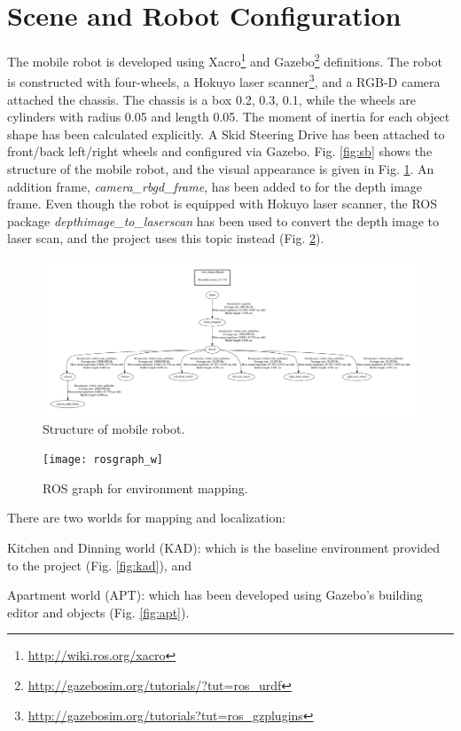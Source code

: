 \documentclass[10pt,journal,compsoc]{IEEEtran}
\begin{document}
\section{Scene and Robot Configuration}

The mobile robot is developed using Xacro\footnote{\url{http://wiki.ros.org/xacro}} and Gazebo\footnote{\url{http://gazebosim.org/tutorials/?tut=ros_urdf}} definitions. The robot is constructed  with four-wheels, a Hokuyo laser scanner\footnote{\url{http://gazebosim.org/tutorials?tut=ros_gzplugins}}, and a RGB-D camera attached the chassis. The chassis is a box 0.2, 0.3, 0.1, while the wheels are cylinders with radius 0.05 and length 0.05.  The moment of inertia for each object shape has been calculated explicitly. A Skid Steering Drive has been attached to front/back left/right wheels and configured via Gazebo. Fig. \ref{fig:sb} shows the structure of the mobile robot, and the visual appearance is given in Fig. \ref{fig:saminda_bot}. An addition frame, \textit{camera\_rbgd\_frame}, has been added to for the depth image frame. Even though the robot is equipped with  Hokuyo laser scanner, the ROS package \textit{depthimage\_to\_laserscan} has been used to convert the depth image to laser scan, and the project uses this topic instead (Fig. \ref{fig:rosgraph}). 

\begin{figure}[thpb]
      \centering
      \includegraphics[width=\linewidth]{frames.pdf}
      \caption{Structure of mobile robot.}
      \label{fig:saminda_bot}
\end{figure}

\begin{figure}[thpb]
      \centering
      \texttt{[image: rosgraph\_w]}
      \caption{ROS graph for environment mapping.}
      \label{fig:rosgraph}
\end{figure}

There are two worlds for mapping and localization: \begin{enumerate*} \item Kitchen and Dinning world (KAD): which is the baseline environment provided to the project (Fig. \ref{fig:kad}), and \item Apartment world (APT): which has been developed using Gazebo's building editor and  objects (Fig. \ref{fig:apt}). \end{enumerate*} 
\end{document}
